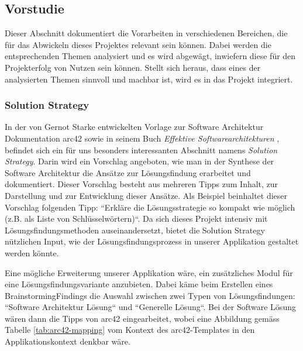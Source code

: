 \subsection{Vorstudie}
\label{subsec:prestudy}
Dieser Abschnitt dokumentiert die Vorarbeiten in verschiedenen Bereichen, die für das Abwickeln dieses Projektes relevant sein können. Dabei werden die entsprechenden Themen analysiert und es wird abgewägt, inwiefern diese für den Projekterfolg von Nutzen sein können. Stellt sich heraus, dass eines der analysierten Themen sinnvoll und machbar ist, wird es in das Projekt integriert.

\subsubsection{Solution Strategy}\label{sec:sol-strategy}

In der von Gernot Starke entwickelten Vorlage zur Software Architektur Dokumentation arc42 \cite{arc-42} sowie in seinem Buch \textit{Effektive Softwarearchitekturen} \cite{eswa}, befindet sich ein für uns besonders interessanten Abschnitt namens \textit{Solution Strategy}. Darin wird ein Vorschlag angeboten, wie man in der Synthese der Software Architektur die Ansätze zur Lösungsfindung erarbeitet und dokumentiert. Dieser Vorschlag besteht aus mehreren Tipps zum Inhalt, zur Darstellung und zur Entwicklung dieser Ansätze. Als Beispiel beinhaltet dieser Vorschlag folgenden Tipp: ``Erkläre die Lösungsstrategie so kompakt wie möglich (z.B. als Liste von Schlüsselwörtern)``. Da sich dieses Projekt intensiv mit Lösungsfindungsmethoden auseinandersetzt, bietet die Solution Strategy nützlichen Input, wie der Lösungsfindungsprozess in unserer Applikation gestaltet werden könnte. 

Eine mögliche Erweiterung unserer Applikation wäre, ein zusätzliches Modul für eine Lösungsfindungsvariante anzubieten. Dabei käme beim Erstellen eines BrainstormingFindings die Auswahl zwischen zwei Typen von Lösungsfindungen: ``Software Architektur Lösung`` und ``Generelle Lösung``. Bei der Software Lösung wären dann die Tipps von arc42 eingearbeitet, wobei eine Abbildung gemäss Tabelle \ref{tab:arc42-mapping} vom Kontext des arc42-Templates in den Applikationskontext denkbar wäre.

